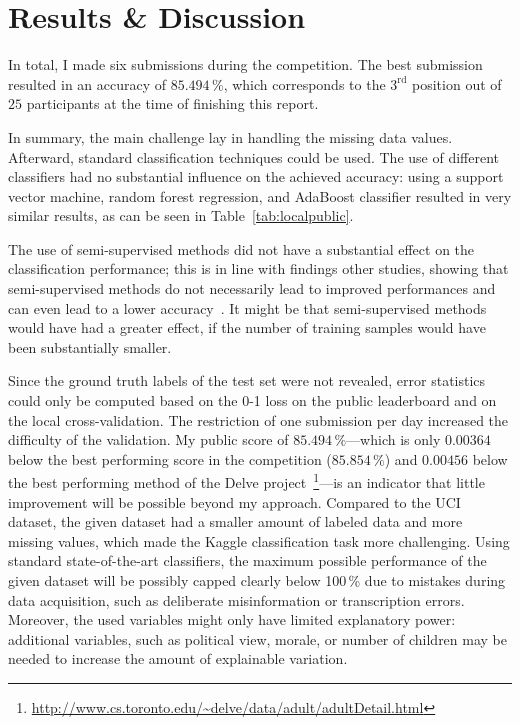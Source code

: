 \documentclass[a4paper]{article}
\begin{document}
\section{Results \& Discussion}
\label{sec:results}

In total, I made six submissions during the competition. The best
submission resulted in an accuracy of $85.494\,\%$, which corresponds
to the $3^{\text{rd}}$ position out of $25$ participants at the time
of finishing this report.

In summary, the main challenge lay in handling the missing data
values.  Afterward, standard classification techniques could be
used. The use of different classifiers had no substantial influence on
the achieved accuracy: using a support vector machine, random forest
regression, and AdaBoost classifier resulted in very similar results,
as can be seen in Table~\ref{tab:localpublic}.


The use of
semi-supervised methods did not have a substantial effect on the
classification performance; this is in line with findings other
studies, showing that semi-supervised methods do not necessarily lead
to improved performances and can even lead to a lower
accuracy~\cite{zhu2005semi}. It might be that semi-supervised methods
would have had a greater effect, if the number of training samples
would have been substantially smaller.

Since the ground truth labels of the test set were not revealed, error
statistics could only be computed based on the 0-1 loss on the public
leaderboard and on the local cross-validation. The restriction of one
submission per day increased the difficulty of the validation. My
public score of $85.494\,\%$---which is only $0.00364$ below the best
performing score in the competition ($85.854\,\%$) and $0.00456$ below
the best performing method of the Delve
project~\footnote{\url{http://www.cs.toronto.edu/~delve/data/adult/adultDetail.html}}---is
an indicator that little improvement will be possible beyond my
approach. Compared to the UCI dataset, the given dataset had a smaller
amount of labeled data and more missing values, which made the Kaggle
classification task more challenging. Using standard state-of-the-art
classifiers, the maximum possible performance of the given dataset
will be possibly capped clearly below 100\,\% due to mistakes during
data acquisition, such as deliberate misinformation or transcription
errors. Moreover, the used variables might only have limited
explanatory power: additional variables, such as political view,
morale, or number of children may be needed to increase the amount
of explainable variation.
\end{document}
